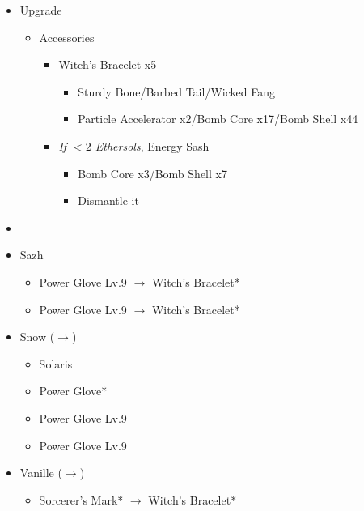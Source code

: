 \begin{upgrade}
	\begin{itemize}
		\item Upgrade
			\begin{itemize}
				\item Accessories
					\begin{itemize}
						\item Witch's Bracelet x5
							\begin{itemize}
								\item Sturdy Bone/Barbed Tail/Wicked Fang
								\item Particle Accelerator x2/Bomb Core x17/Bomb Shell x44
							\end{itemize}
						\item \textit{If $<2$ Ethersols}, Energy Sash
							\begin{itemize}
								\item Bomb Core x3/Bomb Shell x7
								\item Dismantle it
							\end{itemize}
					\end{itemize}
			\end{itemize}
	\end{itemize}
\end{upgrade}
\vfill

\begin{menu}
	\begin{itemize}
	\paradigm
		\begin{itemize}
			\item {}%
				{\paradigmline{\com}{(\rav)}{(\sab)}}%
				{\paradigmline{\com}{(\rav)}{\med}}%
				{\paradigmline{(\rav)}{(\sen)}{(\med)}}%
				{\paradigmline[4]{\com}{\sen}{\med}}%
				{\paradigmline{\syn}{\sen}{\med}}%
				{\paradigmline{\sen}{\sen}{\med}}%
		\end{itemize}
	\equip
		\begin{itemize}
			\item Sazh
				\begin{itemize}
					\item Power Glove Lv.9 $\rightarrow$ Witch's Bracelet*
					\item Power Glove Lv.9 $\rightarrow$ Witch's Bracelet*
				\end{itemize}
			\item Snow ($\rightarrow$)
				\begin{itemize}
					\item Solaris
					\item Power Glove*
					\item Power Glove Lv.9
					\item Power Glove Lv.9
				\end{itemize}
			\item Vanille ($\rightarrow$)
				\begin{itemize}
					\item Sorcerer's Mark* $\rightarrow$ Witch's Bracelet*
				\end{itemize}
		\end{itemize}
	\end{itemize}
\end{menu}

